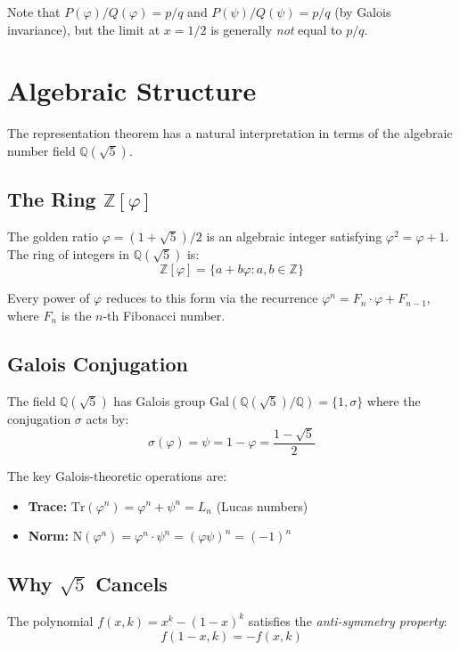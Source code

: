 \documentclass[11pt]{article}
\begin{document}
Note that $P(\varphi)/Q(\varphi) = p/q$ and $P(\psi)/Q(\psi) = p/q$ (by Galois invariance), but the limit at $x = 1/2$ is generally \emph{not} equal to $p/q$.

\section{Algebraic Structure}

The representation theorem has a natural interpretation in terms of the algebraic number field $\mathbb{Q}(\sqrt{5})$.

\subsection{The Ring $\mathbb{Z}[\varphi]$}

The golden ratio $\varphi = (1+\sqrt{5})/2$ is an algebraic integer satisfying $\varphi^2 = \varphi + 1$. The ring of integers in $\mathbb{Q}(\sqrt{5})$ is:
\[
\mathbb{Z}[\varphi] = \{a + b\varphi : a, b \in \mathbb{Z}\}
\]

Every power of $\varphi$ reduces to this form via the recurrence $\varphi^n = F_n \cdot \varphi + F_{n-1}$, where $F_n$ is the $n$-th Fibonacci number.

\subsection{Galois Conjugation}

The field $\mathbb{Q}(\sqrt{5})$ has Galois group $\mathrm{Gal}(\mathbb{Q}(\sqrt{5})/\mathbb{Q}) = \{1, \sigma\}$ where the conjugation $\sigma$ acts by:
\[
\sigma(\varphi) = \psi = 1 - \varphi = \frac{1-\sqrt{5}}{2}
\]

The key Galois-theoretic operations are:
\begin{itemize}
    \item \textbf{Trace:} $\mathrm{Tr}(\varphi^n) = \varphi^n + \psi^n = L_n$ (Lucas numbers)
    \item \textbf{Norm:} $\mathrm{N}(\varphi^n) = \varphi^n \cdot \psi^n = (\varphi\psi)^n = (-1)^n$
\end{itemize}

\subsection{Why $\sqrt{5}$ Cancels}

The polynomial $f(x, k) = x^k - (1-x)^k$ satisfies the \emph{anti-symmetry property}:
\[
f(1-x, k) = -f(x, k)
\]
\end{document}
